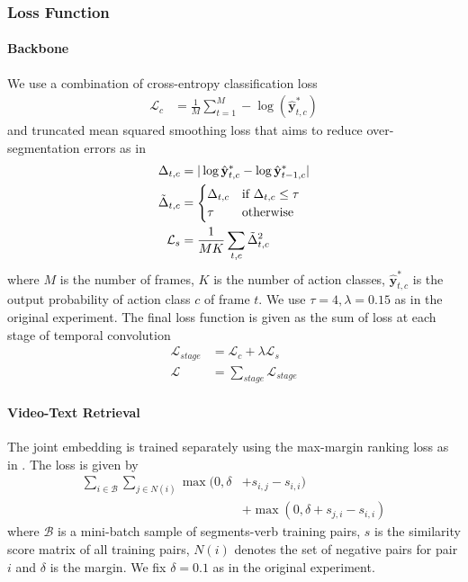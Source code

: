   

\subsubsection{Loss Function}
\paragraph{Backbone} We use a combination of cross-entropy classification loss
\begin{align*}
    \mathcal{L}_c&=\frac{1}{M}\sum_{t=1}^M-\log(\hat{\mathbf{y}}^*_{t,c})
\end{align*}
and truncated mean squared smoothing loss that aims to reduce over-segmentation errors as in \cite{8953830}
\begin{align*}
    \Delta_{t,c}&=|\log\hat{\mathbf{y}}^*_{t,c}-\log\hat{\mathbf{y}}^*_{t-1,c}|\\
    \Tilde{\Delta}_{t,c}&=\begin{cases}\Delta_{t,c} &\text{if $\Delta_{t,c}\le\tau$}\\\tau &\text{otherwise}\end{cases}\\
    \mathcal{L}_s&=\frac{1}{MK}\sum_{t,c}\Tilde{\Delta}^2_{t,c}
 \end{align*}
where $M$ is the number of frames, $K$ is the number of action classes, $\hat{\mathbf{y}}^*_{t,c}$ is the output probability of action class $c$ of frame $t$. We use $\tau=4,\lambda=0.15$ as in the original experiment. The final loss function is given as the sum of loss at each stage of temporal convolution
\begin{align*}
    \mathcal{L}_{stage}&=\mathcal{L}_c+\lambda\mathcal{L}_s\\
    \mathcal{L}&=\sum_{stage}\mathcal{L}_{stage}
\end{align*}

\paragraph{Video-Text Retrieval} The joint embedding is trained separately using the max-margin ranking loss as in \cite{miech19howto100m}. The loss is given by
\begin{align*}
    \sum_{i\in\mathcal{B}}\sum_{j\in N(i)}\max(0,\delta&+s_{i,j}-s_{i,i})\\
    &+\max(0,\delta+s_{j,i}-s_{i,i})
\end{align*}
where $\mathcal{B}$ is a mini-batch sample of segments-verb training pairs, $s$ is the similarity score matrix of all training pairs, $N(i)$ denotes the set of negative pairs for pair $i$ and $\delta$ is the margin. We fix $\delta=0.1$ as in the original experiment.


